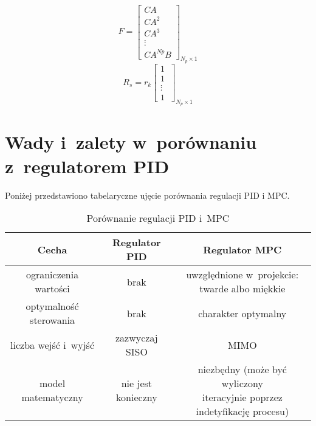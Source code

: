 \begin{equation}
	F = \begin{bmatrix}
	CA \\
	CA^{2} \\
	CA^{3} \\
    \vdots \\
    CA^{Np}B
	\end{bmatrix}_{N_{p} \times 1}
\label{eq:F}
\end{equation}
\begin{equation}
    R_{s} = r_{k}\begin{bmatrix}
    1~\\
    1~\\
    \vdots \\
    1
    \end{bmatrix}_{N_{p} \times 1}
\label{eq:Y}
\end{equation}

\section{Wady i~zalety w~porównaniu z~regulatorem PID} \label{sec:comparison}
Poniżej przedstawiono tabelaryczne ujęcie porównania regulacji PID i MPC.
\cite{mpc_book} \cite{mpc_pl} \cite{mpc_en}

\begin{table}[htb]
	\centering
	\begin{tabular}{c|c|c}
	\toprule
	Cecha & Regulator PID & Regulator MPC \\ \bottomrule
	ograniczenia wartości & brak & \makecell{uwzględnione w~projekcie:\\twarde albo miękkie} \\ \midrule
	optymalność sterowania & brak & charakter optymalny \\ \midrule
	liczba wejść i~wyjść & zazwyczaj SISO & MIMO \\ \midrule
	model matematyczny & nie jest konieczny & \makecell{niezbędny (może być wyliczony \\ iteracyjnie poprzez indetyfikację procesu)} \\
	\bottomrule
	\end{tabular}
\caption{Porównanie regulacji PID i~MPC}
\label{tab:comp_pid_mpc}
\end{table}